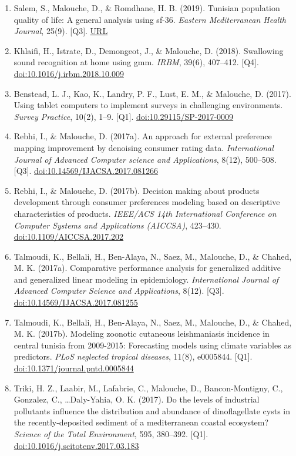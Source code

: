 \documentclass[11pt,a4paper,sans]{moderncv}
\begin{document}
\begin{enumerate}
\item Salem, S., Malouche, D., \& Romdhane, H. B. (2019). Tunisian population quality of life: A general analysis using sf-36. \textit{Eastern Mediterranean Health Journal}, 25(9). [Q3]. \href{https://apps.who.int/iris/bitstream/handle/10665/333459/10203397192509-eng.pdf#page=23}{URL}
\item Khlaifi, H., Istrate, D., Demongeot, J., \& Malouche, D. (2018). Swallowing sound recognition at home using gmm. \textit{IRBM}, 39(6), 407–412. [Q4]. \href{https://doi.org/10.1016/j.irbm.2018.10.009}{doi:10.1016/j.irbm.2018.10.009}
\item Benstead, L. J., Kao, K., Landry, P. F., Lust, E. M., \& Malouche, D. (2017). Using tablet computers to implement surveys in challenging environments. \textit{Survey Practice}, 10(2), 1–9. [Q1]. \href{https://doi.org/10.29115/SP-2017-0009}{doi:10.29115/SP-2017-0009}
\item Rebhi, I., \& Malouche, D. (2017a). An approach for external preference mapping improvement by denoising consumer rating data. \textit{International Journal of Advanced Computer science and Applications}, 8(12), 500–508. [Q3]. \href{https://doi.org/10.14569/IJACSA.2017.081266}{doi:10.14569/IJACSA.2017.081266}
\item Rebhi, I., \& Malouche, D. (2017b). Decision making about products development through consumer preferences modeling based on descriptive characteristics of products. \textit{IEEE/ACS 14th International Conference on Computer Systems and Applications (AICCSA)}, 423–430. \href{https://doi.org/10.1109/AICCSA.2017.202}{doi:10.1109/AICCSA.2017.202}
\item Talmoudi, K., Bellali, H., Ben-Alaya, N., Saez, M., Malouche, D., \& Chahed, M. K. (2017a). Comparative performance analysis for generalized additive and generalized linear modeling in epidemiology. \textit{International Journal of Advanced Computer Science and Applications}, 8(12). [Q3]. \href{https://doi.org/10.14569/IJACSA.2017.081255}{doi:10.14569/IJACSA.2017.081255}
\item Talmoudi, K., Bellali, H., Ben-Alaya, N., Saez, M., Malouche, D., \& Chahed, M. K. (2017b). Modeling zoonotic cutaneous leishmaniasis incidence in central tunisia from 2009-2015: Forecasting models using climate variables as predictors. \textit{PLoS neglected tropical diseases}, 11(8), e0005844. [Q1]. \href{https://doi.org/10.1371/journal.pntd.0005844}{doi:10.1371/journal.pntd.0005844}
\item Triki, H. Z., Laabir, M., Lafabrie, C., Malouche, D., Bancon-Montigny, C., Gonzalez, C., \ldots Daly-Yahia, O. K. (2017). Do the levels of industrial pollutants influence the distribution and abundance of dinoflagellate cysts in the recently-deposited sediment of a mediterranean coastal ecosystem? \textit{Science of the Total Environment}, 595, 380–392. [Q1]. \href{https://doi.org/10.1016/j.scitotenv.2017.03.183}{doi:10.1016/j.scitotenv.2017.03.183}

\end{enumerate}
\end{document}

